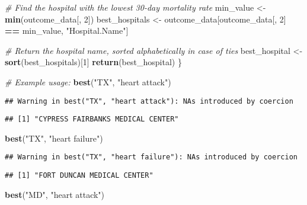 \documentclass[
]{article}
\newenvironment{Shaded}{\begin{snugshade}}{\end{snugshade}}
\newcommand{\CommentTok}[1]{\textcolor[rgb]{0.56,0.35,0.01}{\textit{#1}}}
\newcommand{\DecValTok}[1]{\textcolor[rgb]{0.00,0.00,0.81}{#1}}
\newcommand{\FunctionTok}[1]{\textcolor[rgb]{0.13,0.29,0.53}{\textbf{#1}}}
\newcommand{\NormalTok}[1]{#1}
\newcommand{\OtherTok}[1]{\textcolor[rgb]{0.56,0.35,0.01}{#1}}
\newcommand{\SpecialCharTok}[1]{\textcolor[rgb]{0.81,0.36,0.00}{\textbf{#1}}}
\newcommand{\StringTok}[1]{\textcolor[rgb]{0.31,0.60,0.02}{#1}}
\begin{document}
\begin{Shaded}
\begin{Highlighting}[]
  \CommentTok{\# Find the hospital with the lowest 30{-}day mortality rate}
\NormalTok{  min\_value }\OtherTok{\textless{}{-}} \FunctionTok{min}\NormalTok{(outcome\_data[, }\DecValTok{2}\NormalTok{])}
\NormalTok{  best\_hospitals }\OtherTok{\textless{}{-}}\NormalTok{ outcome\_data[outcome\_data[, }\DecValTok{2}\NormalTok{] }\SpecialCharTok{==}\NormalTok{ min\_value, }\StringTok{"Hospital.Name"}\NormalTok{]}
  
  \CommentTok{\# Return the hospital name, sorted alphabetically in case of ties}
\NormalTok{  best\_hospital }\OtherTok{\textless{}{-}} \FunctionTok{sort}\NormalTok{(best\_hospitals)[}\DecValTok{1}\NormalTok{]}
  \FunctionTok{return}\NormalTok{(best\_hospital)}
\NormalTok{\}}

\CommentTok{\# Example usage:}
\FunctionTok{best}\NormalTok{(}\StringTok{"TX"}\NormalTok{, }\StringTok{"heart attack"}\NormalTok{)}
\end{Highlighting}
\end{Shaded}

\begin{verbatim}
## Warning in best("TX", "heart attack"): NAs introduced by coercion
\end{verbatim}

\begin{verbatim}
## [1] "CYPRESS FAIRBANKS MEDICAL CENTER"
\end{verbatim}

\begin{Shaded}
\begin{Highlighting}[]
\FunctionTok{best}\NormalTok{(}\StringTok{"TX"}\NormalTok{, }\StringTok{"heart failure"}\NormalTok{)}
\end{Highlighting}
\end{Shaded}

\begin{verbatim}
## Warning in best("TX", "heart failure"): NAs introduced by coercion
\end{verbatim}

\begin{verbatim}
## [1] "FORT DUNCAN MEDICAL CENTER"
\end{verbatim}

\begin{Shaded}
\begin{Highlighting}[]
\FunctionTok{best}\NormalTok{(}\StringTok{"MD"}\NormalTok{, }\StringTok{"heart attack"}\NormalTok{)}
\end{Highlighting}
\end{Shaded}
\end{document}
